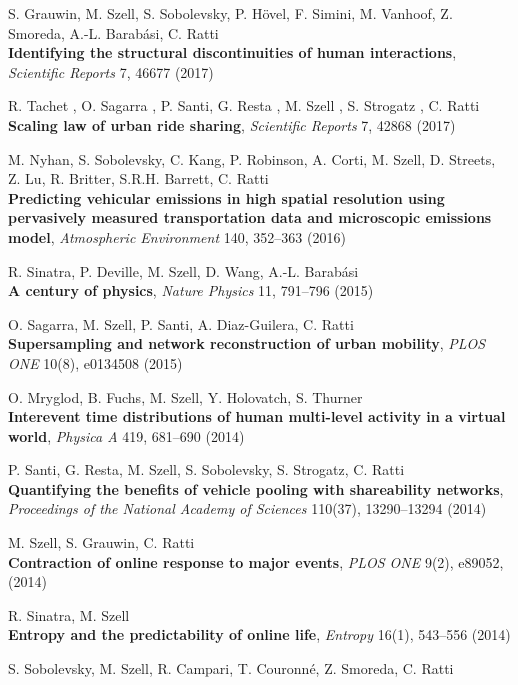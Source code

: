 \documentclass[10pt,a4paper]{article}
\renewenvironment{itemize}{
  \begin{list}{}{
    \setlength{\leftmargin}{1.5em}
    \setlength{\itemsep}{0.25em}
    \setlength{\parskip}{0pt}
    \setlength{\parsep}{0.25em}
  }
}{
  \end{list}
}
\begin{document}
\begin{itemize}
\item S. Grauwin, M. Szell, S. Sobolevsky, P. H\"{o}vel, F. Simini, M. Vanhoof, Z. Smoreda, A.-L. Barab\'asi, C. Ratti\\
    \textbf{Identifying the structural discontinuities of human interactions}, \textit{Scientific Reports} 7, 46677 (2017)
\item R. Tachet , O. Sagarra , P. Santi, G. Resta , M. Szell , S. Strogatz , C. Ratti\\
    \textbf{Scaling law of urban ride sharing}, \textit{Scientific Reports} 7, 42868 (2017)
\item M. Nyhan, S. Sobolevsky, C. Kang, P. Robinson, A. Corti, M. Szell, D. Streets, Z. Lu, R. Britter, S.R.H. Barrett, C. Ratti\\
    \textbf{Predicting vehicular emissions in high spatial resolution using pervasively measured transportation data and microscopic emissions model}, \textit{Atmospheric Environment} 140, 352--363 (2016)
\item R. Sinatra, P. Deville, M. Szell, D. Wang, A.-L. Barab\'asi\\
    \textbf{A century of physics}, \textit{Nature Physics} 11, 791--796 (2015)
\item O. Sagarra, M. Szell, P. Santi, A. Diaz-Guilera, C. Ratti\\
    \textbf{Supersampling and network reconstruction of urban mobility}, \textit{PLOS ONE} 10(8), e0134508 (2015)
\item O. Mryglod, B. Fuchs, M. Szell, Y. Holovatch, S. Thurner\\
    \textbf{Interevent time distributions of human multi-level activity in a virtual world}, \textit{Physica A} 419, 681--690 (2014)
\item P. Santi, G. Resta, M. Szell, S. Sobolevsky, S. Strogatz, C. Ratti\\
    \textbf{Quantifying the benefits of vehicle pooling with shareability networks},  \textit{Proceedings of the National Academy of Sciences} 110(37), 13290--13294 (2014)
\item M. Szell, S. Grauwin, C. Ratti\\
    \textbf{Contraction of online response to major events}, \textit{PLOS ONE} 9(2), e89052, (2014)
\item R. Sinatra, M. Szell\\
    \textbf{Entropy and the predictability of online life}, \textit{Entropy} 16(1), 543--556 (2014)
\item S. Sobolevsky, M. Szell, R. Campari, T. Couronn\'e, Z. Smoreda, C. Ratti\\

\end{itemize}
\end{document}
